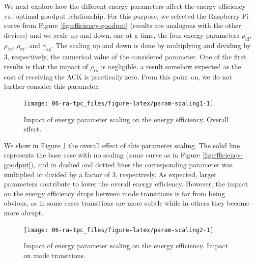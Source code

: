 \documentclass[twoside,nohyper]{tufte-book}
\theoremstyle{definition}
\theoremstyle{definition}
\theoremstyle{definition}
\theoremstyle{remark}
\begin{document}
We next explore how the different energy parameters affect the energy
efficiency vs.~optimal goodput relationship. For this purpose, we
selected the Raspberry Pi curve from Figure \ref{fig:efficiency-goodput}
(results are analogous with the other devices) and we scale up and down,
one at a time, the four energy parameters \(\rho_\mathrm{id}\),
\(\rho_\mathrm{tx}\), \(\rho_\mathrm{rx}\), and \(\gamma_\mathrm{xg}\).
The scaling up and down is done by multiplying and dividing by 3,
respectively, the numerical value of the considered parameter. One of
the first results is that the impact of \(\rho_\mathrm{rx}\) is
negligible, a result somehow expected as the cost of receiving the ACK
is practically zero. From this point on, we do not further consider this
parameter.




\begin{figure}

{\centering \texttt{[image: 06-ra-tpc\_files/figure-latex/param-scaling1-1]} 

}

\caption[Impact of energy parameter scaling on the energy
efficiency. Overall effect.]{Impact of energy parameter scaling on the energy
efficiency. Overall effect.}\label{fig:param-scaling1}
\end{figure}

We show in Figure \ref{fig:param-scaling1} the overall effect of this
parameter scaling. The solid line represents the base case with no
scaling (same curve as in Figure \ref{fig:efficiency-goodput}), and in
dashed and dotted lines the corresponding parameter was multiplied or
divided by a factor of 3, respectively. As expected, larger parameters
contribute to lower the overall energy efficiency. However, the impact
on the energy efficiency drops between mode transitions is far from
being obvious, as in some cases transitions are more subtle while in
others they become more abrupt.




\begin{figure}

{\centering \texttt{[image: 06-ra-tpc\_files/figure-latex/param-scaling2-1]} 

}

\caption[Impact of energy parameter scaling on the energy
efficiency. Impact on mode transitions.]{Impact of energy parameter scaling on the energy
efficiency. Impact on mode transitions.}\label{fig:param-scaling2}
\end{figure}
\end{document}

